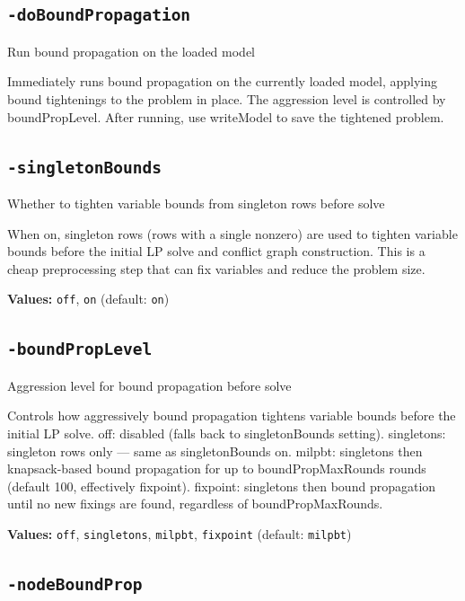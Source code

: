 \documentclass[11pt,a4paper]{article}
\begin{document}
\subsection*{\texttt{-doBoundPropagation}}

Run bound propagation on the loaded model

Immediately runs bound propagation on the currently loaded model, applying bound tightenings to the problem in place. The aggression level is controlled by boundPropLevel. After running, use writeModel to save the tightened problem.

\subsection*{\texttt{-singletonBounds}}

Whether to tighten variable bounds from singleton rows before solve

When on, singleton rows (rows with a single nonzero) are used to tighten variable bounds before the initial LP solve and conflict graph construction. This is a cheap preprocessing step that can fix variables and reduce the problem size.

\textbf{Values:} \texttt{off}, \texttt{on} (default: \texttt{on})

\subsection*{\texttt{-boundPropLevel}}

Aggression level for bound propagation before solve

Controls how aggressively bound propagation tightens variable bounds before the initial LP solve.
  off:       disabled (falls back to singletonBounds setting).
  singletons: singleton rows only --- same as singletonBounds on.
  milpbt:    singletons then knapsack-based bound propagation for up to boundPropMaxRounds rounds (default 100, effectively fixpoint).
  fixpoint:  singletons then bound propagation until no new fixings are found, regardless of boundPropMaxRounds.

\textbf{Values:} \texttt{off}, \texttt{singletons}, \texttt{milpbt}, \texttt{fixpoint} (default: \texttt{milpbt})

\subsection*{\texttt{-nodeBoundProp}}
\end{document}
